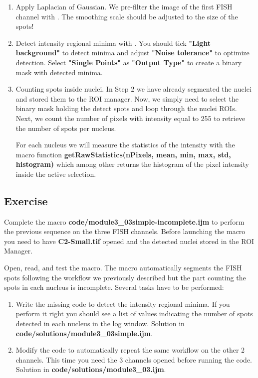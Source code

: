 \begin{enumerate}
    \item Apply Laplacian of Gaussian. We pre-filter the image of the first FISH channel with . The smoothing scale should be adjusted to the size of the spots! 
    
    
    \item Detect intensity regional minima with . You should tick \textbf{"Light background"} to detect minima and adjust \textbf{"Noise tolerance"} to optimize detection. Select \textbf{"Single Points"} as \textbf{"Output Type"} to create a binary mask with detected minima.
    
    \item Counting spots inside nuclei.
    In Step 2 we have already segmented the nuclei and stored them to the ROI manager. Now, we simply need to select the binary mask holding the detect spots and loop through the nuclei ROIs. Next, we count the number of pixels with intensity equal to 255 to retrieve the number of spots per nucleus.
    
    For each nucleus we will measure the statistics of the intensity with the macro function \textbf{getRawStatistics(nPixels, mean, min, max, std, histogram)} which among other returns the histogram of the pixel intensity inside the active selection. 

\end{enumerate}

\subsection{Exercise }
Complete the macro \textbf{code/module3\_03simple-incomplete.ijm} to perform the previous sequence on the three FISH channels. Before launching the macro you need to have \textbf{C2-Small.tif} opened and the detected nuclei stored in the ROI Manager.

Open, read, and test the macro. The macro automatically segments the FISH spots following the workflow we previously described but the part counting the spots in each nucleus is incomplete. Several tasks have to be performed:

\begin{enumerate}

\item Write the missing code to detect the intensity regional minima. If you perform it right you should see a list of values indicating the number of spots detected in each nucleus in the log window. Solution in \textbf{code/solutions/module3\_03simple.ijm}.

\item Modify the code to automatically repeat the same workflow on the other 2 channels. This time you need the 3 channels opened before running the code. Solution in \textbf{code/solutions/module3\_03.ijm}.
\end{enumerate}

